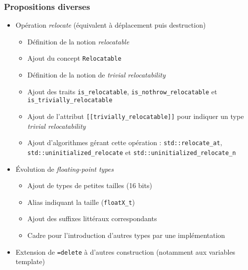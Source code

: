 \documentclass[C++.tex]{subfiles}
\begin{document}
\begin{frame}[fragile]
	\frametitle{Propositions diverses}
	\begin{itemize}
		\item Opération \og \textit{relocate}\fg{} (équivalent à déplacement puis destruction)


		\begin{itemize}
			\item Définition de la notion \og \textit{relocatable}\fg{} 
			\item Ajout du concept \lstinline|Relocatable|


			\item Définition de la notion de \og \textit{trivial relocatability}\fg{}


			\item Ajout des traits \lstinline|is_relocatable|, \lstinline|is_nothrow_relocatable| et \lstinline|is_trivially_relocatable|
			\item Ajout de l'attribut \lstinline|[[trivially_relocatable]]| pour indiquer un type \textit{trivial relocatability}
			\item Ajout d'algorithmes gérant cette opération : \lstinline|std::relocate_at|, \lstinline|std::uninitialized_relocate| et \lstinline|std::uninitialized_relocate_n|
		\end{itemize}



		\item Évolution de \textit{floating-point types}
		\begin{itemize}
			\item Ajout de types de petites tailles (16 bits)
			\item Alias indiquant la taille (\lstinline|floatX_t|)
			\item Ajout des suffixes littéraux correspondants
			\item Cadre pour l'introduction d'autres types par une implémentation
		\end{itemize}

		\item Extension de \lstinline|=delete| à d'autres construction (notamment aux variables template)

	\end{itemize}
\end{frame}
\end{document}
